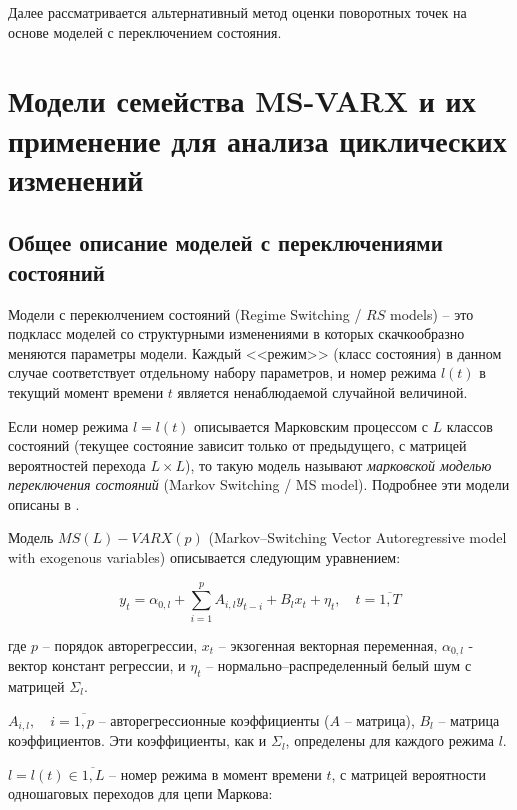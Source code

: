 \documentclass[a4paper,14pt]{extreport}
\begin{document}
	Далее рассматривается альтернативный метод оценки поворотных точек на основе моделей с переключением состояния.
	

	
	\section{Модели семейства MS-VARX и их применение для анализа циклических изменений}
	
	\subsection{Общее описание моделей с переключениями состояний}
	Модели с перекюлчением состояний (Regime Switching / $RS$ models) -- это подкласс моделей со структурными изменениями в которых скачкообразно меняются параметры модели. Каждый <<режим>> (класс состояния) в данном случае соответствует отдельному набору параметров, и номер режима $l(t)$ в текущий момент времени $t$ является ненаблюдаемой случайной величиной.
	
	Если номер режима $l = l(t)$ описывается Марковским процессом с $L$ классов состояний (текущее состояние зависит только от предыдущего, с матрицей вероятностей перехода $L \times L$), то такую модель называют \textit{марковской моделью переключения состояний} (Markov Switching / MS model). Подробнее эти модели описаны в \cite{malNovopMSVARX,mal_methods_nonconstant}.
	
	Модель $MS(L)-VARX(p)$ (Markov--Switching Vector Autoregressive model with exogenous variables) описывается следующим уравнением:
	
	\begin{equation}
		y_{t} = \alpha_{0,l} + \sum_{i=1}^{p} A_{i,l} y_{t-i} + B_{l} x_{t} + \eta_{t}, 
		\quad t = \overline{1,T}
		\label{eq:var_equation}
	\end{equation}
	
	где $p$ -- порядок авторегрессии, $x_{t}$ -- экзогенная векторная переменная, $\alpha_{0,l}$ - вектор констант регрессии, и $\eta_{t}$ -- нормально--распределенный белый шум с матрицей $\Sigma_{l}$.
	
	$A_{i,l}, \quad i = \overline{1,p} $ -- авторегрессионные коэффициенты ($A$ -- матрица), $B_{l}$ -- матрица коэффициентов. Эти коэффициенты, как и $\Sigma_{l}$, определены для каждого режима $l$.
	
	$l=l(t) \in \overline{1,L}$ -- номер режима в момент времени $t$, с матрицей вероятности одношаговых переходов для цепи Маркова:
	
\end{document}
